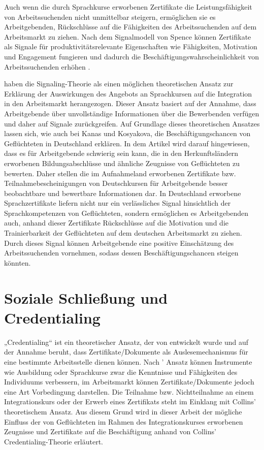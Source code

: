 Auch wenn die durch Sprachkurse erworbenen Zertifikate die Leistungsfähigkeit von Arbeitssuchenden nicht unmittelbar steigern, ermöglichen sie es Arbeitgebenden, Rückschlüsse auf die Fähigkeiten des Arbeitssuchenden auf dem Arbeitsmarkt zu ziehen. Nach dem Signalmodell von Spence können Zertifikate als Signale für produktivitätsrelevante Eigenschaften wie Fähigkeiten, Motivation und Engagement fungieren und dadurch die Beschäftigungswahrscheinlichkeit von Arbeitssuchenden erhöhen \parencite[355--356]{Spence1973}.

\textcite{Kanas:2023} haben die Signaling-Theorie als einen möglichen theoretischen Ansatz zur Erklärung der Auswirkungen des Angebots an Sprachkursen auf die Integration in den Arbeitsmarkt herangezogen. Dieser Ansatz basiert auf der Annahme, dass Arbeitgebende über unvollständige Informationen über die Bewerbenden verfügen und daher auf Signale zurückgreifen. Auf Grundlage dieses theoretischen Ansatzes lassen sich, wie auch bei Kanas und Kosyakova, die Beschäftigungschancen von Geflüchteten in Deutschland erklären. In dem Artikel wird darauf hingewiesen, dass es für Arbeitgebende schwierig sein kann, die in den Herkunftsländern erworbenen Bildungsabschlüsse und ähnliche Zeugnisse von Geflüchteten zu bewerten. Daher stellen die im Aufnahmeland erworbenen Zertifikate bzw. Teilnahmebescheinigungen von Deutschkursen für Arbeitgebende besser beobachtbare und bewertbare Informationen dar. In Deutschland erworbene Sprachzertifikate liefern nicht nur ein verlässliches Signal hinsichtlich der Sprachkompetenzen von Geflüchteten, sondern ermöglichen es Arbeitgebenden auch, anhand dieser Zertifikate Rückschlüsse auf die Motivation und die Trainierbarkeit der Geflüchteten auf dem deutschen Arbeitsmarkt zu ziehen. Durch dieses Signal können Arbeitgebende eine positive Einschätzung des Arbeitssuchenden vornehmen, sodass dessen Beschäftigungschancen steigen könnten.

\section{Soziale Schließung und Credentialing}
\label{cha:Soziale Schließung}

„Credentialing“ ist ein theoretischer Ansatz, der von \textcite{collins1979credential} entwickelt wurde und auf der Annahme beruht, dass Zertifikate/Dokumente als Auslesemechanismus für eine bestimmte Arbeitsstelle dienen können. Nach \textcite{collins1979credential}’ Ansatz können Instrumente wie Ausbildung oder Sprachkurse zwar die Kenntnisse und Fähigkeiten des Individuums verbessern, im Arbeitsmarkt können Zertifikate/Dokumente jedoch eine Art Vorbedingung darstellen. Die Teilnahme bzw. Nichtteilnahme an einem Integrationskurs oder der Erwerb eines Zertifikats steht im Einklang mit Collins’ theoretischem Ansatz. Aus diesem Grund wird in dieser Arbeit der mögliche Einfluss der von Geflüchteten im Rahmen des Integrationskurses erworbenen Zeugnisse und Zertifikate auf die Beschäftigung anhand von Collins’ Credentialing-Theorie erläutert.

